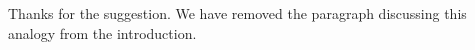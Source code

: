 

Thanks for the suggestion. We have removed the paragraph discussing this analogy from the introduction.

